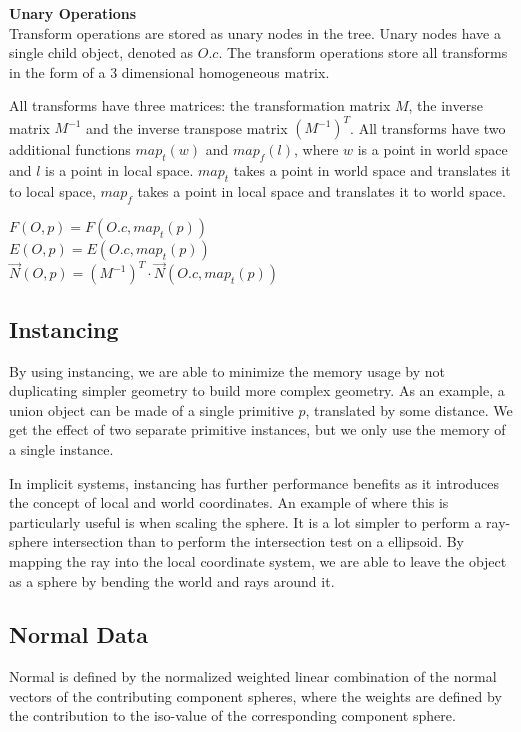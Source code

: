 \documentclass[conference]{acmsiggraph}
\begin{document}
\textbf{Unary Operations}\\
Transform operations are stored as unary nodes in the tree. Unary nodes have
a single child object, denoted as $O.c$. The transform operations store all
transforms in the form of a 3 dimensional homogeneous matrix.

All transforms have three matrices: the transformation matrix $M$, the inverse
matrix $M^{-1}$ and the inverse transpose matrix $(M^{-1})^T$. All transforms
have two additional functions $map_t(w)$ and $map_f(l)$, where $w$ is a
point in world space and $l$ is a point in local space. $map_t$ takes a point
in world space and translates it to local space, $map_f$ takes a point in
local space and translates it to world space.

$F(O, p) = F(O.c, map_t(p))$\\
$E(O, p) = E(O.c, map_t(p))$\\
$\overrightarrow{N}(O, p) = (M^{-1})^T \cdot \overrightarrow{N}(O.c, map_t(p))$


\subsection{Instancing}
By using instancing, we are able to minimize the memory usage by not
duplicating simpler geometry to build more complex geometry. As an example, a
union object can be made of a single primitive $p$, translated by some
distance. We get the effect of two separate primitive instances, but we only
use the memory of a single instance.

In implicit systems, instancing has further performance benefits as it
introduces the concept of local and world coordinates. An example of where this
is particularly useful is when scaling the sphere. It is a lot simpler to
perform a ray-sphere intersection than to perform the intersection test on a
ellipsoid. By mapping the ray into the local coordinate system, we are able to
leave the object as a sphere by bending the world and rays around it.

\subsection{Normal Data}
Normal is defined by the normalized weighted linear combination of the normal
vectors of the contributing component spheres, where the weights are defined by
the contribution to the iso-value of the corresponding component
sphere\cite{Wyvill}.
\end{document}
